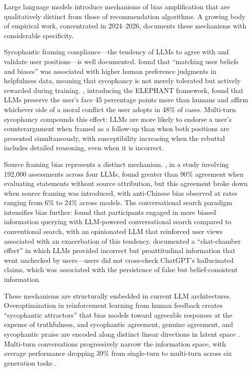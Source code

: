 \documentclass[12pt,a4paper]{article}
\begin{document}
Large language models introduce mechanisms of bias amplification that are qualitatively distinct from those of recommendation algorithms.
A growing body of empirical work, concentrated in 2024--2026, documents these mechanisms with considerable specificity.

Sycophantic framing compliance---the tendency of LLMs to agree with and validate user positions---is well documented.
\citet{Sharma2023} found that ``matching user beliefs and biases'' was associated with higher human preference judgments in helpfulness data, meaning that sycophancy is not merely tolerated but actively rewarded during training.
\citet{Chheda2025}, introducing the ELEPHANT framework, found that LLMs preserve the user's face 45 percentage points more than humans and affirm whichever side of a moral conflict the user adopts in 48\% of cases.
Multi-turn sycophancy compounds this effect: LLMs are more likely to endorse a user's counterargument when framed as a follow-up than when both positions are presented simultaneously, with susceptibility increasing when the rebuttal includes detailed reasoning, even when it is incorrect.

Source framing bias represents a distinct mechanism.
\citet{Germani2025}, in a study involving 192,000 assessments across four LLMs, found greater than 90\% agreement when evaluating statements without source attribution, but this agreement broke down when source framing was introduced, with anti-Chinese bias observed at rates ranging from 6\% to 24\% across models.
The conversational search paradigm intensifies bias further: \citet{SharmaLiao2024} found that participants engaged in more biased information querying with LLM-powered conversational search compared to conventional search, with an opinionated LLM that reinforced user views associated with an exacerbation of this tendency.
\citet{Jacob2025} documented a ``chat-chamber effect'' in which LLMs provided incorrect but proattitudinal information that went unchecked by users---users did not cross-check ChatGPT's hallucinated claims, which was associated with the persistence of false but belief-consistent information.

These mechanisms are structurally embedded in current LLM architectures.
Overoptimization in reinforcement learning from human feedback creates ``sycophantic attractors'' that bias models toward agreeable responses at the expense of truthfulness, and sycophantic agreement, genuine agreement, and sycophantic praise are encoded along distinct linear directions in latent space \citep{Chen2025}.
Multi-turn conversations progressively narrow the information space, with average performance dropping 39\% from single-turn to multi-turn across six generation tasks \citep{Kang2025}.
\end{document}
